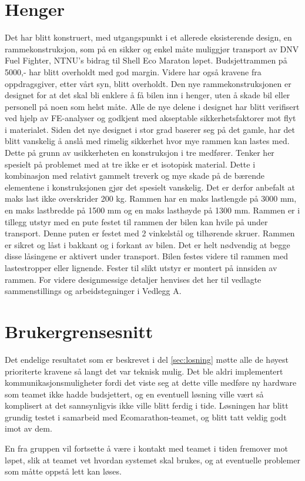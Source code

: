 \section{Henger}
Det har blitt konstruert, med utgangspunkt i et allerede eksisterende design, en rammekonstruksjon, som på en sikker og enkel måte muliggjør transport av DNV Fuel Fighter, NTNU’s bidrag til Shell Eco Maraton løpet. Budsjettrammen på 5000,- har blitt overholdt med god margin. Videre har også kravene fra oppdragsgiver, etter vårt syn, blitt overholdt. Den nye rammekonstruksjonen er designet for at det skal bli enklere å få bilen inn i henger, uten å skade bil eller personell på noen som helst måte. 
Alle de nye delene i designet har blitt verifisert ved hjelp av FE-analyser og godkjent med akseptable sikkerhetsfaktorer mot flyt i materialet. 
Siden det nye designet i stor grad baserer seg på det gamle, har det blitt vanskelig å anslå med rimelig sikkerhet hvor mye rammen kan lastes med. Dette på grunn av usikkerheten en konstruksjon i tre medfører. Tenker her spesielt på problemet med at tre ikke er et isotopisk material. Dette i kombinasjon med relativt gammelt treverk og mye skade på de bærende elementene i konstruksjonen gjør det spesielt vanskelig. Det er derfor anbefalt at maks last ikke overskrider 200 kg. Rammen har en maks lastlengde på 3000 mm, en maks lastbredde på 1500 mm og en maks lasthøyde på 1300 mm. 
Rammen er i tillegg utstyr med en pute festet til rammen der bilen kan hvile på under transport. Denne puten er festet med 2 vinkelstål og tilhørende skruer. 
Rammen er sikret og låst i bakkant og i forkant av bilen. Det er helt nødvendig at begge disse låsingene er aktivert under transport. Bilen festes videre til rammen med lastestropper eller lignende. Fester til slikt utstyr er montert på innsiden av rammen. For videre designmessige detaljer henvises det her til vedlagte sammenstillings og arbeidstegninger i Vedlegg A.
\section{Brukergrensesnitt}
Det endelige resultatet som er beskrevet i del \ref{sec:losning} møtte alle de høyest prioriterte kravene så langt det var teknisk mulig.
Det ble aldri implementert kommunikasjonsmuligheter fordi det viste seg at dette ville medføre ny hardware som teamet ikke hadde budsjettert, og en eventuell løsning ville vært så komplisert at det sannsynligvis ikke ville blitt ferdig i tide.
Løsningen har blitt grundig testet i samarbeid med Ecomarathon-teamet, og blitt tatt veldig godt imot av dem.

En fra gruppen vil fortsette å være i kontakt med teamet i tiden fremover mot løpet, slik at teamet vet hvordan systemet skal brukes, og at eventuelle problemer som måtte oppstå lett kan løses.
